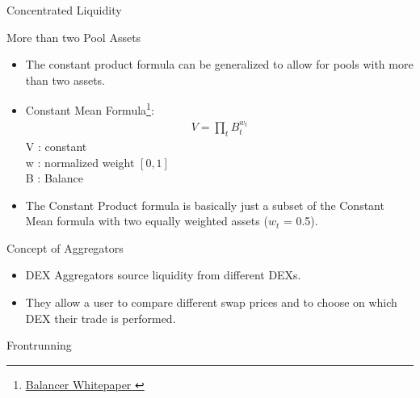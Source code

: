 \documentclass[]{beamer}
\begin{document}
\begin{frame}{Concentrated Liquidity}
	\begin{figure}[h!]
		\begin{center}
			
		\end{center}
	\end{figure}	
\end{frame}


\begin{frame}{More than two Pool Assets}
\begin{itemize}
	\item The constant product formula can be generalized to allow for pools with more than two assets.
	\item Constant Mean Formula\footnote{\href{https://balancer.fi/whitepaper.pdf}{Balancer Whitepaper \link}}:
		\begin{align*}
			V = \prod_t B^{w_{t}}_{t}
		\end{align*}
	V : constant \\ w : normalized weight $[0,1]$ \\ B : Balance
	\item The Constant Product formula is basically just a subset of the Constant Mean formula with two equally weighted assets ($w_t$ = 0.5).
\end{itemize}

\end{frame}


\begin{frame}{Concept of Aggregators}

\begin{figure}
	\centering
	\resizebox{0.8\textwidth}{!}{
	\begin{tikzpicture}[scale=1.0, every node/.style={scale=1.0}]
			
	\end{tikzpicture}}
\end{figure}
	
\begin{itemize}
	\item DEX Aggregators source liquidity from different DEXs.
	\item They allow a user to compare different swap prices and to choose on which DEX their trade is performed.
\end{itemize}

\end{frame}


\begin{frame}{Frontrunning}

\end{frame}
\end{document}
